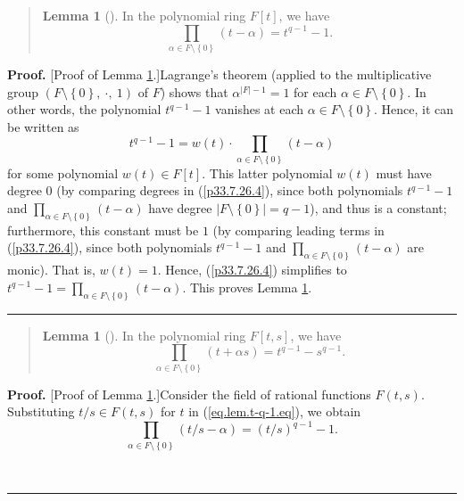 \documentclass[numbers=enddot,12pt,final,onecolumn,notitlepage]{scrartcl}%
\newenvironment{statement}{\begin{quote}}{\end{quote}}
\theoremstyle{definition}
\newtheorem{lem}[theo]{Lemma}
\newenvironment{lemmain}[1][]
{\begin{statement}\begin{lem}[#1]}
{\end{lem}\end{statement}}
\newenvironment{proof}[1][Proof]{\noindent\textbf{#1.} }{\ \rule{0.5em}{0.5em}}
\newenvironment{lemmain}[1][Proof]{\noindent\textbf{#1.} }{\ \rule{0.5em}{0.5em}}
\let\prodnonlimits\prod
\renewcommand{\prod}{\prodnonlimits\limits}
\begin{document}
\begin{enumerate}
\begin{lemmain}
\label{lem.t-q-1}In the polynomial ring $F\left[  t\right]  $, we have%
\begin{equation}
\prod_{\alpha\in F\setminus\left\{  0\right\}  }\left(  t-\alpha\right)
=t^{q-1}-1. \label{eq.lem.t-q-1.eq}%
\end{equation}

\end{lemmain}

\begin{proof}
[Proof of Lemma \ref{lem.t-q-1}.]Lagrange's theorem (applied to the
multiplicative group $\left(  F\setminus\left\{  0\right\}  ,\ \cdot
,\ 1\right)  $ of $F$) shows that $\alpha^{\left\vert F\right\vert -1}=1$ for
each $\alpha\in F\setminus\left\{  0\right\}  $. In other words, the
polynomial $t^{q-1}-1$ vanishes at each $\alpha\in F\setminus\left\{
0\right\}  $. Hence, it can be written as%
\begin{equation}
t^{q-1}-1=w\left(  t\right)  \cdot\prod_{\alpha\in F\setminus\left\{
0\right\}  }\left(  t-\alpha\right)  \label{p33.7.26.4}%
\end{equation}
for some polynomial $w\left(  t\right)  \in F\left[  t\right]  $. This latter
polynomial $w\left(  t\right)  $ must have degree $0$ (by comparing degrees in
(\ref{p33.7.26.4}), since both polynomials $t^{q-1}-1$ and $\prod_{\alpha\in
F\setminus\left\{  0\right\}  }\left(  t-\alpha\right)  $ have degree
$\left\vert F\setminus\left\{  0\right\}  \right\vert =q-1$), and thus is a
constant; furthermore, this constant must be $1$ (by comparing leading terms
in (\ref{p33.7.26.4}), since both polynomials $t^{q-1}-1$ and $\prod
_{\alpha\in F\setminus\left\{  0\right\}  }\left(  t-\alpha\right)  $ are
monic). That is, $w\left(  t\right)  =1$. Hence, (\ref{p33.7.26.4}) simplifies
to $t^{q-1}-1=\prod_{\alpha\in F\setminus\left\{  0\right\}  }\left(
t-\alpha\right)  $. This proves Lemma \ref{lem.t-q-1}.
\end{proof}

\begin{lemmain}
\label{lem.t-q-2}In the polynomial ring $F\left[  t,s\right]  $, we have%
\begin{equation}
\prod_{\alpha\in F\setminus\left\{  0\right\}  }\left(  t+\alpha s\right)
=t^{q-1}-s^{q-1}. \label{eq.lem.t-q-2.eq}%
\end{equation}

\end{lemmain}

\begin{proof}
[Proof of Lemma \ref{lem.t-q-2}.]Consider the field of rational functions
$F\left(  t,s\right)  $. Substituting $t/s\in F\left(  t,s\right)  $ for $t$
in (\ref{eq.lem.t-q-1.eq}), we obtain%
\[
\prod_{\alpha\in F\setminus\left\{  0\right\}  }\left(  t/s-\alpha\right)
=\left(  t/s\right)  ^{q-1}-1.
\]



\end{proof}
\end{enumerate}
\end{document}
